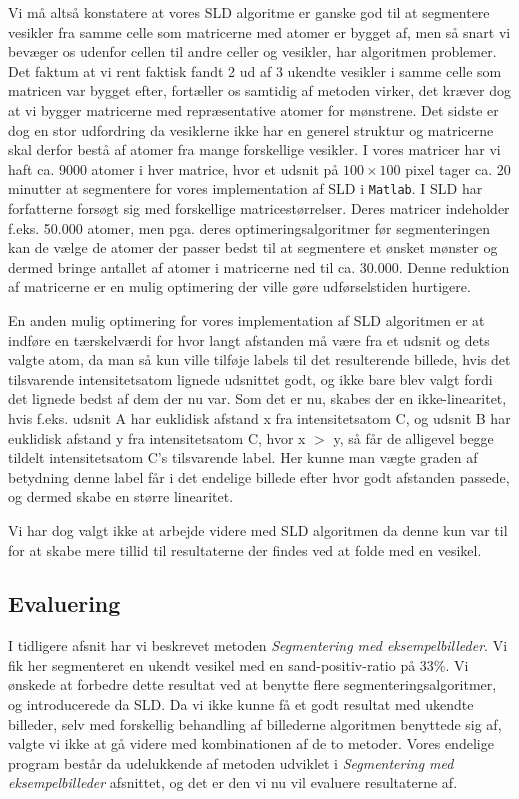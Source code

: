 Vi må altså konstatere at vores SLD algoritme er ganske god til at segmentere vesikler fra samme celle som matricerne med atomer er bygget af, men så snart vi bevæger os udenfor cellen til andre celler og vesikler, har algoritmen problemer. Det faktum at vi rent faktisk fandt 2 ud af 3 ukendte vesikler i samme celle som matricen var bygget efter, fortæller os samtidig af metoden virker, det kræver dog at vi bygger matricerne med repræsentative atomer for mønstrene. Det sidste er dog en stor udfordring da vesiklerne ikke har en generel struktur og matricerne skal derfor bestå af atomer fra mange forskellige vesikler. I vores matricer har vi haft ca. 9000 atomer i hver matrice, hvor et udsnit på $100\times100$ pixel tager ca. 20 minutter at segmentere for vores implementation af SLD i \texttt{Matlab}. I SLD har forfatterne forsøgt sig med forskellige matricestørrelser. Deres matricer indeholder f.eks. 50.000 atomer, men pga. deres optimeringsalgoritmer før segmenteringen kan de vælge de atomer der passer bedst til at segmentere et ønsket mønster og dermed bringe antallet af atomer i matricerne ned til ca. 30.000. Denne reduktion af matricerne er en mulig optimering der ville gøre udførselstiden hurtigere. 

En anden mulig optimering for vores implementation af SLD algoritmen er at indføre en tærskelværdi for hvor langt afstanden må være fra et udsnit og dets valgte atom, da man så kun ville tilføje labels til det resulterende billede, hvis det tilsvarende intensitetsatom lignede udsnittet godt, og ikke bare blev valgt fordi det lignede bedst af dem der nu var. Som det er nu, skabes der en ikke-linearitet, hvis f.eks. udsnit A har euklidisk afstand x fra intensitetsatom C, og udsnit B har euklidisk afstand y fra intensitetsatom C, hvor x $>$ y, så får de alligevel begge tildelt intensitetsatom C's tilsvarende label. Her kunne man vægte graden af betydning denne label får i det endelige billede efter hvor godt afstanden passede, og dermed skabe en større linearitet. 

Vi har dog valgt ikke at arbejde videre med SLD algoritmen da denne kun var til for at skabe mere tillid til resultaterne der findes ved at folde med en vesikel. \\

\subsection{Evaluering}
I tidligere afsnit har vi beskrevet metoden \emph{Segmentering med eksempelbilleder}. Vi fik her segmenteret en ukendt vesikel med en sand-positiv-ratio på 33\%. Vi ønskede at forbedre dette resultat ved at benytte flere segmenteringsalgoritmer, og introducerede da SLD. Da vi ikke kunne få et godt resultat med ukendte billeder, selv med forskellig behandling af billederne algoritmen benyttede sig af, valgte vi ikke at gå videre med kombinationen af de to metoder. Vores endelige program består da udelukkende af metoden udviklet i \emph{Segmentering med eksempelbilleder} afsnittet, og det er den vi nu vil evaluere resultaterne af.

